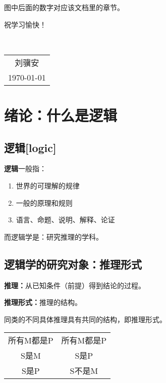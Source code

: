 \documentclass[12pt,onecolumn,a4paper]{book}
\numberwithin{table}{subsection}
\numberwithin{equation}{subsection}
\begin{document}
图中后面的数字对应该文档里的章节。

祝学习愉快！

~\\
\begin{flushright}
    \begin{tabular}{c}
        刘骥安\\
        \today
    \end{tabular}
\end{flushright}



\newpage
{}
\setcounter{page}{1}
\tableofcontents
\newpage
\setcounter{page}{1}



\chapter{绪论：什么是逻辑}\label{chap1}

\section{逻辑[logic]}

\textbf{逻辑}一般指：

\begin{enumerate}[itemsep=0pt,parsep=0pt]
    \item 世界的可理解的规律
    \item 一般的原理和规则
    \item 语言、命题、说明、解释、论证
\end{enumerate}

而逻辑学是：研究推理的学科。

\section{逻辑学的研究对象：推理形式}

\textbf{推理：}从已知条件（前提）得到结论的过程。

\textbf{推理形式：}推理的结构。

同类的不同具体推理具有共同的结构，即推理形式。

\begin{table}
    \centering
    \begin{tabular}{c|c}
        所有M都是P & 所有M都是P \\
        S是M & S是P \\
        \hline
        S是P & S不是M \\
    \end{tabular}
\end{table}
\end{document}
